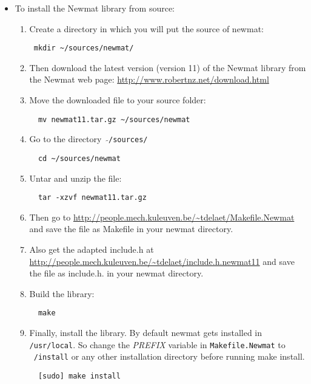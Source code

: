 \documentclass[a4paper,10pt]{article}
\begin{document}
\begin{itemize}
\item To install the Newmat library from source:
\begin{enumerate}
\item Create a directory in which you will put the source of newmat:
\begin{verbatim}
 mkdir ~/sources/newmat/
\end{verbatim}
\item Then download the latest version (version 11) of the Newmat library from the
  Newmat web page:
  \url{http://www.robertnz.net/download.html}
\item Move the downloaded file to your source folder:
\begin{verbatim}
  mv newmat11.tar.gz ~/sources/newmat
\end{verbatim}
\item Go to the directory \ $\mathtt{\tilde{ }}$\texttt{/sources/}
\begin{verbatim}
  cd ~/sources/newmat
\end{verbatim}
\item Untar and unzip the file:
\begin{verbatim}
  tar -xzvf newmat11.tar.gz
\end{verbatim}
\item Then go to \url{http://people.mech.kuleuven.be/~tdelaet/Makefile.Newmat} and save the file as Makefile in your newmat directory.
\item Also get the adapted include.h at \url{http://people.mech.kuleuven.be/~tdelaet/include.h.newmat11} and save the file as include.h. in your newmat directory.
\item Build the library:
\begin{verbatim}
  make 
\end{verbatim}
\item Finally, install the library.  By default newmat gets installed
  in \texttt{/usr/local}.  So change the \emph{PREFIX} variable in \texttt{Makefile.Newmat} to \texttt{~/install} or any other installation directory before running make install.
\begin{verbatim}
  [sudo] make install
\end{verbatim}
\end{enumerate}
\end{itemize}
\end{document}
